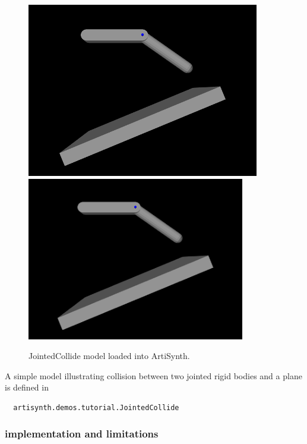 \begin{figure}[h]
\begin{center}
\iflatexml
 \includegraphics[]{images/JointedCollide}
\else
 \includegraphics[width=3.75in]{images/JointedCollide}
\fi
\end{center}
\caption{JointedCollide model loaded into ArtiSynth.}
\label{JointedCollide:fig}
\end{figure}

A simple model illustrating collision between two jointed rigid bodies
and a plane is defined in
%
\begin{verbatim}
  artisynth.demos.tutorial.JointedCollide
\end{verbatim}
%


\subsubsection{implementation and limitations}


